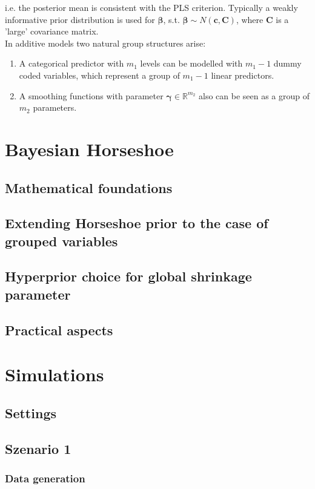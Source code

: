 \documentclass[12pt,letterpaper]{article}
\begin{document}
i.e. the posterior mean is consistent with the PLS criterion. Typically a weakly informative prior distribution is used for $\mathbf{\beta}$, s.t. $\mathbf{\beta} \sim N(\mathbf{c},\mathbf{C})$, where $\mathbf{C}$ is a 'large' covariance matrix.
\\ In additive models two natural group structures arise:
\begin{enumerate}
\item A categorical predictor with $m_{1}$ levels can be modelled with $m_1 -1$ dummy coded variables, which represent a group of $m_1 - 1$ linear predictors.
\item A smoothing functions with parameter $\mathbf{\gamma} \in \mathbb{R}^{m_2}$ also can be seen as a group of $m_2$ parameters.
\end{enumerate}
\label{sec:AddMod}
\pagebreak

\section{Bayesian Horseshoe}
\subsection{Mathematical foundations}
\subsection{Extending Horseshoe prior to the case of grouped variables}
\subsection{Hyperprior choice for global shrinkage parameter}
\label{sec:gHSP}
\subsection{Practical aspects}
\pagebreak

\section{Simulations}
\subsection{Settings}

\subsection{Szenario 1}
\subsubsection{Data generation}
\end{document}
